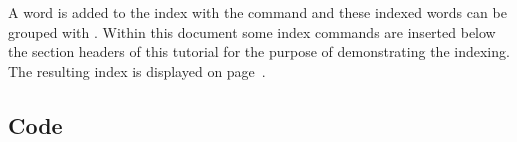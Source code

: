 A word is added to the index with the command  and these indexed words can be grouped with . Within this document some index commands are inserted below the section headers of this tutorial for the purpose of demonstrating the indexing. The resulting index is displayed on page~\pageref{sec:Index}. 
\subsection{Code}
\label{sec:example:code}



